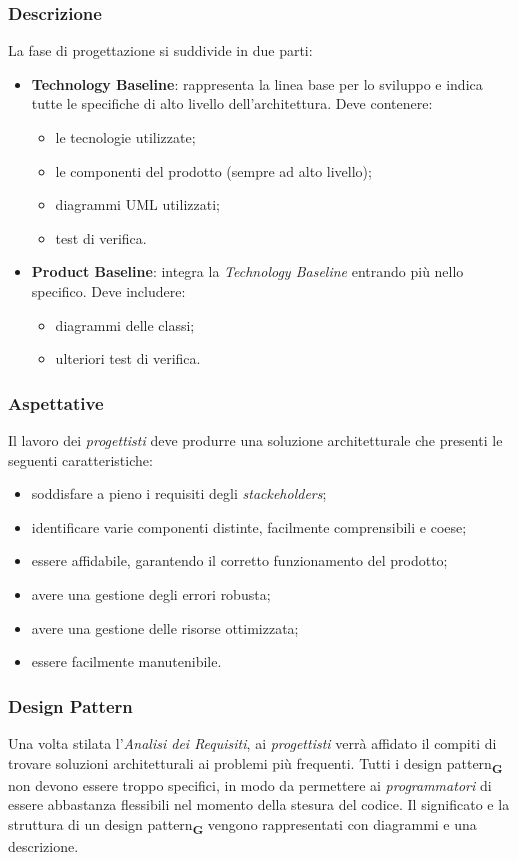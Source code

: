 \subsubsection{Descrizione}
La fase di progettazione si suddivide in due parti:
\begin{itemize}
    \item\textbf{Technology Baseline}: rappresenta la linea base per lo sviluppo e indica tutte le specifiche di alto livello dell'architettura. Deve contenere:
          \begin{itemize}
              \item le tecnologie utilizzate;
              \item le componenti del prodotto (sempre ad alto livello);
              \item diagrammi UML utilizzati;
              \item test di verifica.
          \end{itemize}
    \item\textbf{Product Baseline}: integra la \textit{Technology Baseline} entrando più nello specifico. Deve includere:
          \begin{itemize}
              \item diagrammi delle classi;
              \item ulteriori test di verifica.
          \end{itemize}
\end{itemize}
\subsubsection{Aspettative}
Il lavoro dei \textit{progettisti} deve produrre una soluzione architetturale che presenti le seguenti caratteristiche:
\begin{itemize}
    \item soddisfare a pieno i requisiti degli \textit{stackeholders};
    \item identificare varie componenti distinte, facilmente comprensibili e coese;
    \item essere affidabile, garantendo il corretto funzionamento del prodotto;
    \item avere una gestione degli errori robusta;
    \item avere una gestione delle risorse ottimizzata;
    \item essere facilmente manutenibile.
\end{itemize}
\subsubsection{Design Pattern}
Una volta stilata l'\textit{Analisi dei Requisiti}, ai \textit{progettisti} verrà affidato il compiti di trovare soluzioni architetturali ai problemi più frequenti.
Tutti i design pattern\textsubscript{\textbf{G}} non devono essere troppo specifici, in modo da permettere ai \textit{programmatori} di essere abbastanza flessibili nel momento della stesura del codice.
Il significato e la struttura di un design pattern\textsubscript{\textbf{G}} vengono rappresentati con diagrammi e una descrizione.
